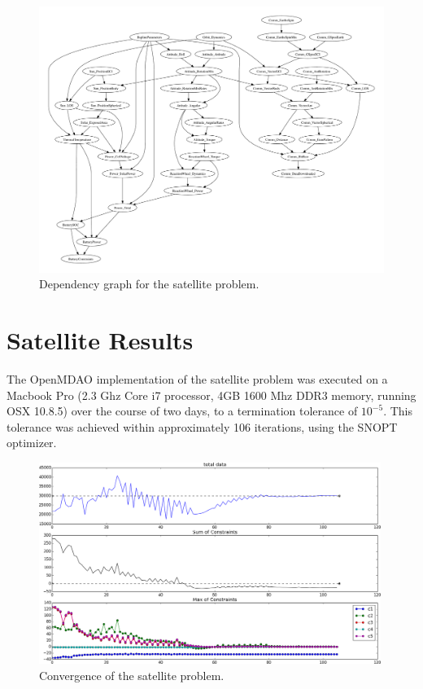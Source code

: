 \documentclass[]{aiaa-tc} %
\begin{document}
    \begin{figure}[!htb]\begin{center}
      \includegraphics[width=1.1\textwidth]{images/CADRE.pdf}
      \caption{ Dependency graph for the satellite problem. \label{fig:cadre_graph}}
    \end{center}\end{figure}

  \section{Satellite Results}

    The OpenMDAO implementation of the satellite problem was executed on a
    Macbook Pro (2.3 Ghz Core i7 processor, 4GB 1600 Mhz DDR3 memory, running OSX 10.8.5)
    over the course of two days, to a termination tolerance of $10^{-5}$. This tolerance
    was achieved within approximately 106 iterations, using the SNOPT\cite{gill2005snopt}
    optimizer.

    \begin{figure}
    \centering
    \includegraphics[width=0.99\textwidth]{images/opt}
    \caption[width=0.22\textwidth]{Convergence of the satellite problem.
    \label{convergence}
    }
    \end{figure}
\end{document}
